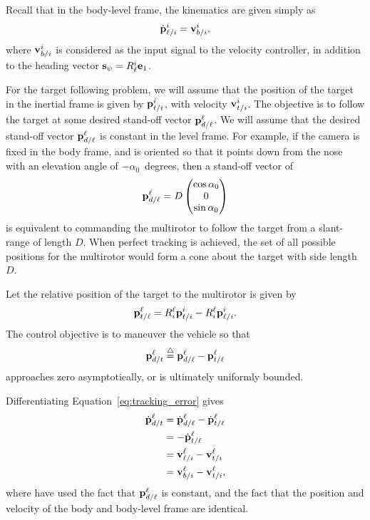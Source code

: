 Recall that in the body-level frame, the kinematics are given simply as
\[
\dot{\mathbf{p}}_{\ell/i}^i = \mathbf{v}_{b/i}^i,
\]
where $\mathbf{v}_{b/i}^i$ is considered as the input signal to the velocity controller, in addition to the heading vector $\mathbf{s}_{\psi} = R_\ell^i \mathbf{e}_1$.  

For the target following problem, we will assume that the position of the target in the inertial frame is given by $\mathbf{p}_{t/i}^i$, with velocity $\mathbf{v}_{t/i}^i$.  The objective is to follow the target at some desired stand-off vector $\mathbf{p}_{d/\ell}^\ell$.  
We will assume that the desired stand-off vector $\mathbf{p}_{d/\ell}^\ell$ is constant in the level frame.  For example, if the camera is fixed in the body frame, and is oriented so that it points down from the nose with an elevation angle of $-\alpha_0$~degrees, then a stand-off vector of
\[
\mathbf{p}_{d/\ell}^\ell = D\begin{pmatrix} \cos\alpha_0 \\ 0 \\ \sin\alpha_0 \end{pmatrix}
\]
is equivalent to commanding the multirotor to follow the target from a slant-range of length $D$.  When perfect tracking is achieved, the set of all possible positions for the multirotor would form a cone about the target with side length $D$.


Let the relative position of the target to the multirotor is given by
\[
\mathbf{p}_{t/\ell}^\ell = R_i^\ell \mathbf{p}_{t/i}^i - R_i^\ell \mathbf{p}_{\ell/i}^i.
\]
The control objective is to maneuver the vehicle so that
\begin{equation}\label{eq:tracking_error}
\pbf_{d/t}^\ell \defeq \pbf_{d/\ell}^\ell - \pbf_{t/\ell}^\ell
\end{equation}
approaches zero asymptotically, or is ultimately uniformly bounded.

Differentiating Equation~\eqref{eq:tracking_error} gives
\begin{align*}
\dot{\mathbf{p}}_{d/t}^\ell &= \dot{\mathbf{p}}_{d/\ell}^\ell - \dot{\mathbf{p}}_{t/\ell}^\ell \\
					  &= - \dot{\mathbf{p}}_{t/\ell}^\ell \\
					  &= \mathbf{v}_{\ell/i}^\ell - \mathbf{v}_{t/i}^\ell \\
					  &= \mathbf{v}_{b/i}^\ell - \mathbf{v}_{t/i}^\ell,
\end{align*}
where have used the fact that $\mathbf{p}_{d/\ell}^\ell$ is constant, and the fact that the position and velocity of the body and body-level frame are identical. 


